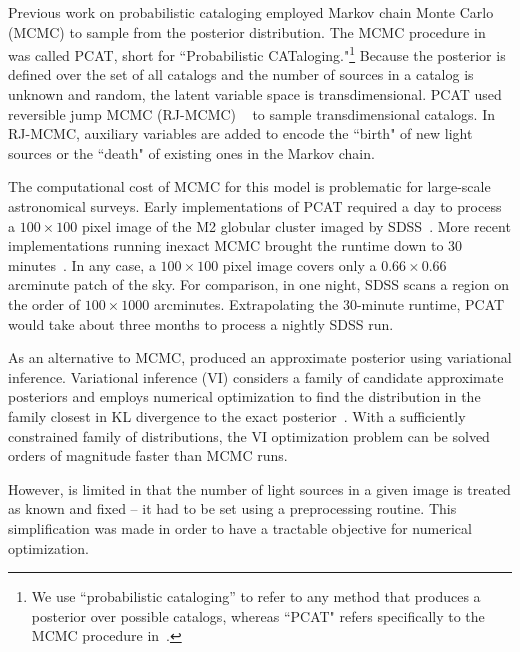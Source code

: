 Previous work on probabilistic cataloging employed Markov chain Monte Carlo (MCMC) to sample from the posterior distribution.
The MCMC procedure in~\cite{Portillo_2017, Feder_2019}
was called PCAT, short for ``Probabilistic CATaloging."\footnote{
We use ``probabilistic cataloging'' to refer to any method that produces a posterior over possible catalogs, whereas ``PCAT" refers specifically to the MCMC procedure in~\cite{Portillo_2017, Feder_2019}. }
Because the posterior is defined over the set of all catalogs and the number of sources in a catalog is unknown and random, 
the latent variable space is transdimensional. PCAT
used reversible jump MCMC (RJ-MCMC) ~\cite{Green95reversiblejump} to sample transdimensional catalogs. In RJ-MCMC, auxiliary variables are added to encode the ``birth" of new light sources 
or the ``death" of existing ones in the Markov chain.

The computational cost of MCMC for this model is problematic for large-scale astronomical surveys. 
Early implementations of PCAT required a day to process a $100\times 100$ pixel image of the M2 globular cluster imaged by SDSS~\cite{Portillo_2017}. 
More recent implementations running inexact MCMC brought the runtime down to 30  minutes~\cite{Feder_2019}.  
In any case, a $100\times 100$ pixel image covers only a $0.66 \times 0.66$ arcminute patch of the sky.
For comparison, in one night, SDSS scans a region on the order of $100 \times 1000$ arcminutes. 
Extrapolating the 30-minute runtime, PCAT would take about three months to process a nightly SDSS run. 

As an alternative to MCMC, \cite{regier2019_celeste} produced an approximate posterior using variational inference.
Variational inference (VI) considers a family of candidate approximate posteriors and employs numerical optimization to find the distribution in the family closest
in KL divergence to the exact posterior~\cite{Blei_2017_vi_review,Jordan_intro_vi, Wainwrite_graph_models_vi}. 
With a sufficiently constrained family of distributions, the VI optimization problem can be solved orders of magnitude faster than MCMC runs. 

However, \cite{regier2019_celeste} is limited in that the number of light sources in a given image is treated as known and fixed -- it had to be set using a preprocessing routine. 
This simplification was made in order to have a tractable objective for numerical optimization. 

\bigbreak


